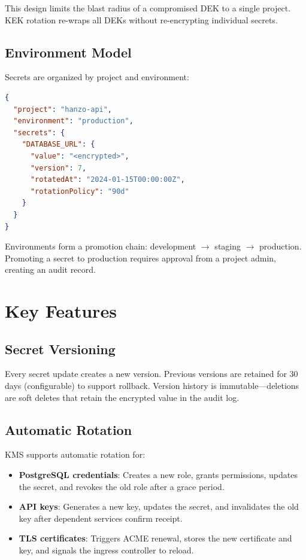 \documentclass[11pt,twocolumn]{article}
\begin{document}
This design limits the blast radius of a compromised DEK to a single project. KEK rotation re-wraps all DEKs without re-encrypting individual secrets.

\subsection{Environment Model}

Secrets are organized by project and environment:

\begin{lstlisting}[language=JSON]
{
  "project": "hanzo-api",
  "environment": "production",
  "secrets": {
    "DATABASE_URL": {
      "value": "<encrypted>",
      "version": 7,
      "rotatedAt": "2024-01-15T00:00:00Z",
      "rotationPolicy": "90d"
    }
  }
}
\end{lstlisting}

Environments form a promotion chain: development $\rightarrow$ staging $\rightarrow$ production. Promoting a secret to production requires approval from a project admin, creating an audit record.

\section{Key Features}

\subsection{Secret Versioning}

Every secret update creates a new version. Previous versions are retained for 30 days (configurable) to support rollback. Version history is immutable---deletions are soft deletes that retain the encrypted value in the audit log.

\subsection{Automatic Rotation}

KMS supports automatic rotation for:
\begin{itemize}
    \item \textbf{PostgreSQL credentials}: Creates a new role, grants permissions, updates the secret, and revokes the old role after a grace period.
    \item \textbf{API keys}: Generates a new key, updates the secret, and invalidates the old key after dependent services confirm receipt.
    \item \textbf{TLS certificates}: Triggers ACME renewal, stores the new certificate and key, and signals the ingress controller to reload.
\end{itemize}
\end{document}
